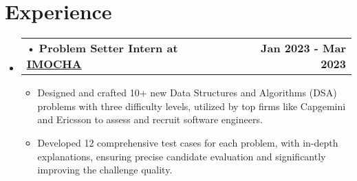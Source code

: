 \documentclass[letterpaper,11pt]{article}
\makeatletter
\newcommand{\resumeItem}[1]{
  \item\small{
	{#1 \vspace{-2pt}}
  }
}
\newcommand{\resumeProjectHeading}[2]{
	\item
	\begin{tabular*}{1.001\textwidth}{l@{\extracolsep{\fill}}r}
  	\small#1 & \textbf{\small #2}\\
	\end{tabular*}\vspace{-7pt}
}
\newcommand{\resumeSubHeadingListStart}{\begin{itemize}[leftmargin=0.0in, label={}]}
\newcommand{\resumeSubHeadingListEnd}{\end{itemize}}
\newcommand{\resumeItemListStart}{\begin{itemize}}
\newcommand{\resumeItemListEnd}{\end{itemize}\vspace{-5pt}}
\makeatother
\begin{document}
 
\section{Experience }
\begin{itemize}[leftmargin=0.12in, label={}]
    \vspace{-12pt}
    \resumeSubHeadingListStart
 
      \resumeProjectHeading
       {\hspace{-5pt}• { \textbf{Problem Setter Intern at \href{https://www.imocha.io/}{IMOCHA}} }  }{Jan 2023 - Mar 2023}
        \resumeItemListStart
             \vspace{5pt}
            \resumeItem{ Designed and crafted 10+ new Data Structures and Algorithms (DSA) problems with three difficulty levels, utilized by top firms like Capgemini and Ericsson to assess and recruit software engineers.}
             \vspace{4pt}
             
            \resumeItem{ Developed 12 comprehensive test cases for each problem, with in-depth explanations, ensuring precise candidate evaluation and significantly improving the challenge quality.}
        \resumeItemListEnd
        \vspace{-4pt}
    \resumeSubHeadingListEnd
 \end{itemize} 
\vspace{-6pt}



\end{document}
